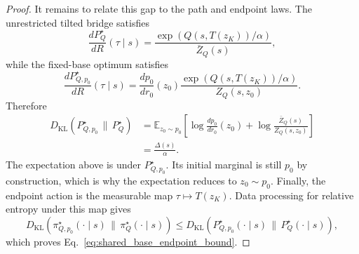 \documentclass[10pt,a4paper]{amsart}
\begin{document}
\begin{proof}
It remains to relate this gap to the path and endpoint laws. The unrestricted tilted bridge satisfies
\begin{equation}
  \frac{
    dP_Q^\star
  }{
    dR
  }(\tau\mid s)
  =
  \frac{
    \exp(Q(s,T(z_K))/\alpha)
  }{
    \bar Z_Q(s)
  },
\end{equation}
while the fixed-base optimum satisfies
\begin{equation}
  \frac{
    dP_{Q,p_0}^\star
  }{
    dR
  }(\tau\mid s)
  =
  \frac{
    dp_0
  }{
    dr_0
  }(z_0)
  \frac{
    \exp(Q(s,T(z_K))/\alpha)
  }{
    Z_Q(s,z_0)
  }.
\end{equation}
Therefore
\begin{align}
  D_{\mathrm{KL}}
  \left(
    P_{Q,p_0}^\star
    \,\|\,P_Q^\star
  \right)
  &=
  \mathbb E_{z_0\sim p_0}
  \left[
    \log
    \frac{
      dp_0
    }{
      dr_0
    }(z_0)
    +
    \log
    \frac{
      \bar Z_Q(s)
    }{
      Z_Q(s,z_0)
    }
  \right]
  \nonumber\\
  &=
  \frac{
    \Delta(s)
  }{
    \alpha
  }.
\end{align}
The expectation above is under $P_{Q,p_0}^\star$. Its initial marginal is still $p_0$ by construction, which is why the expectation reduces to $z_0\sim p_0$. Finally, the endpoint action is the measurable map $\tau\mapsto T(z_K)$. Data processing for relative entropy under this map gives
\begin{equation}
  D_{\mathrm{KL}}
  \left(
    \pi_{Q,p_0}^\star(\cdot\mid s)
    \,\|\,\pi_Q^\star(\cdot\mid s)
  \right)
  \le
  D_{\mathrm{KL}}
  \left(
    P_{Q,p_0}^\star(\cdot\mid s)
    \,\|\,P_Q^\star(\cdot\mid s)
  \right),
\end{equation}
which proves Eq.~\eqref{eq:shared_base_endpoint_bound}.
\end{proof}
\end{document}

